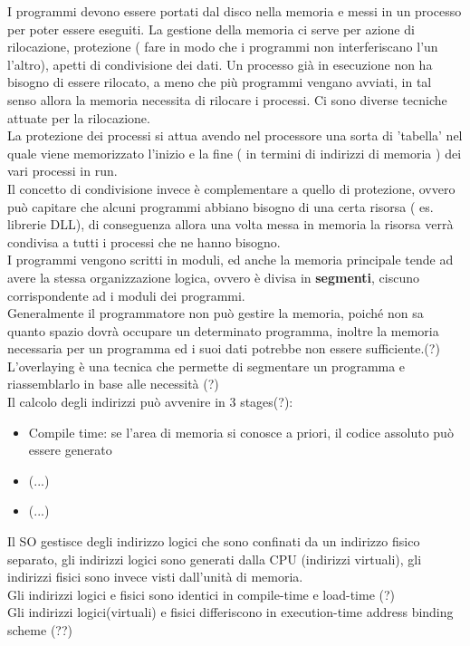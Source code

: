 \documentclass[12pt, a4paper]{article}
\begin{document}
	I programmi devono essere portati dal disco nella memoria e messi in un processo per poter essere eseguiti. La gestione della memoria ci serve per azione di rilocazione, protezione ( fare in modo che i programmi non interferiscano l'un l'altro), apetti di condivisione dei dati. Un processo già in esecuzione non ha bisogno di essere rilocato, a meno che più programmi vengano avviati, in tal senso allora la memoria necessita di rilocare i processi. Ci sono diverse tecniche attuate per la rilocazione. \\ 
	La protezione dei processi si attua avendo nel processore una sorta di 'tabella' nel quale viene memorizzato l'inizio e la fine ( in termini di indirizzi di memoria ) dei vari processi in run. \\
	Il concetto di condivisione invece è complementare a quello di protezione, ovvero può capitare che alcuni programmi abbiano bisogno di una certa risorsa ( es. librerie DLL), di conseguenza allora una volta messa in memoria la risorsa verrà condivisa a tutti i processi che ne hanno bisogno. \\
	I programmi vengono scritti in moduli, ed anche la memoria principale tende ad avere la stessa organizzazione logica, ovvero è divisa in \textbf{segmenti}, ciscuno corrispondente ad i moduli dei programmi. \\
	Generalmente il programmatore non può gestire la memoria, poiché non sa quanto spazio dovrà occupare un determinato programma, inoltre la memoria necessaria per un programma ed i suoi dati potrebbe non essere sufficiente.(?) L'overlaying è una tecnica che permette di segmentare un programma e riassemblarlo in base alle necessità (?) \\
	Il calcolo degli indirizzi può avvenire in 3 stages(?): 
	\begin{itemize}
		\item Compile time: se l'area di memoria si conosce a priori, il codice assoluto può essere generato
		\item (...)
		\item (...)
	\end{itemize}
	Il SO gestisce degli indirizzo logici che sono confinati da un indirizzo fisico separato, gli indirizzi logici sono generati dalla CPU (indirizzi virtuali), gli indirizzi fisici sono invece visti dall'unità di memoria. \\
	Gli indirizzi logici e fisici sono identici in compile-time e load-time (?) \\
	Gli indirizzi logici(virtuali) e fisici differiscono in execution-time address binding scheme (??) \\\\
	
\end{document}
